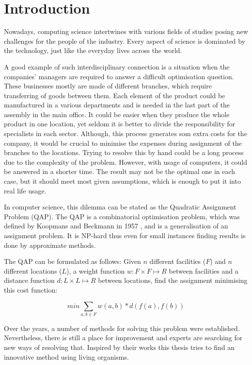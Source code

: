 \chapter{Introduction}
\label{chapter:introduction}

Nowadays, computing science intertwines with various fields of studies posing new challenges for the people of the industry. Every aspect of science is dominated by the technology, just like the everyday lives across the world.

A good example of such interdisciplinary connection is a situation when the companies' managers are required to answer a difficult optimisation question. These businesses mostly are made of different branches, which require transferring of goods between them. Each element of the product could be manufactured in a various departments and is needed in the last part of the assembly in the main office. It could be easier when they produce the whole product in one location, yet seldom it is better to divide the responsibility for specialists in each sector. Although, this process generates som extra costs for the company, it would be crucial to minimise the expenses during assignment of the branches to the locations. Trying to resolve this by hand could be a long process due to the complexity of the problem. However, with usage of computers, it could be answered in a shorter time. The result may not be the optimal one in each case, but it should meet most given assumptions, which is enough to put it into real life usage.

In computer science, this dilemma can be stated as the Quadratic Assignment Problem (QAP).  The QAP is a combinatorial optimisation problem, which was defined by Koopmans and Beckmann in 1957 \cite{koopmans-beckmann1957}, and is a generalisation of an assignment problem. It is NP-hard thus even for small instances finding results is done by approximate methods.

The QAP can be formulated as follows: Given $ n $ different facilities ($F$) and $ n $ different locations ($L$), a weight function $ w: F \times F \mapsto R $ between facilities and a distance function $ d: L \times L \mapsto R $ between locations, find the assignment minimising this cost function:

\begin{equation}
min \sum_{a, b \in F} w(a, b) * d( f(a), f(b))
\end{equation}

Over the years, a number of methods for solving this problem were established. Nevertheless, there is still a place for improvement and experts are searching for new ways of resolving that. Inspired by their works this thesis tries to find an innovative method using living organisms.

